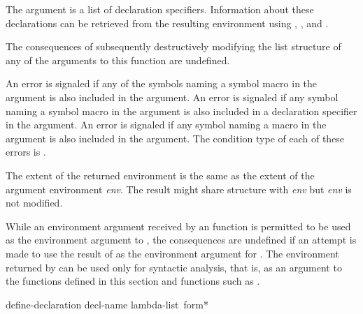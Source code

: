 \begin{newer}
\begin{defun}[Function]
\begin{flushdesc}
\item[\cd{:declare}]
      The argument is a list of declaration specifiers.
      Information about these declarations can
                be retrieved from the resulting environment using
                , , and
                .
\end{flushdesc}
  The consequences of subsequently
  destructively modifying the list
  structure of any of the arguments to this function are undefined.

  An error is signaled if any of the symbols naming a symbol macro in the
   argument is also included in the  argument.
  An error is
  signaled if any symbol naming a symbol macro in the  argument is
  also included in a  declaration specifier in the  argument.
  An error is
  signaled if any symbol naming a macro in the  argument is also included
  in the  argument.
  The condition type of each of these errors is .

  The extent of the returned environment is the same as the extent of the
  argument environment \emph{env}.  The result might share structure with \emph{env}
  but \emph{env} is not modified.

  While an environment argument received by an 
  function is permitted to be used as the
  environment argument to , the consequences are undefined if an
  attempt is made to use the result of  as the environment
  argument for .  The environment
  returned by  can be used only for syntactic analysis, that is,
  as an argument to
  the functions defined in this section and functions such as .
\end{defun}

\begin{defmac}
define-declaration decl-name lambda-list {\,form}*


\end{defmac}
\end{newer}
